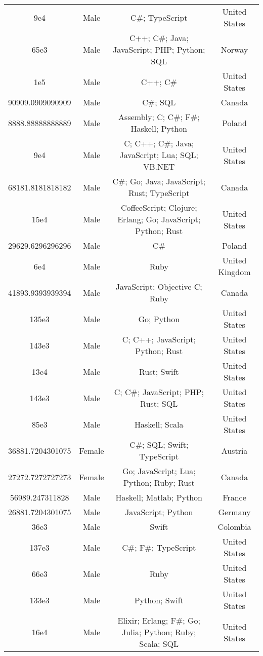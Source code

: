 \begin{center}
\begin{tabular}{ |c|c|c|c| }
9e4  &  Male  &  C\#; TypeScript  &  United States  \\ 
65e3  &  Male  &  C++; C\#; Java; JavaScript; PHP; Python; SQL  &  Norway  \\ 
1e5  &  Male  &  C++; C\#  &  United States  \\ 
90909.0909090909  &  Male  &  C\#; SQL  &  Canada  \\ 
8888.88888888889  &  Male  &  Assembly; C; C\#; F\#; Haskell; Python  &  Poland  \\ 
9e4  &  Male  &  C; C++; C\#; Java; JavaScript; Lua; SQL; VB.NET  &  United States  \\ 
68181.8181818182  &  Male  &  C\#; Go; Java; JavaScript; Rust; TypeScript  &  Canada  \\ 
15e4  &  Male  &  CoffeeScript; Clojure; Erlang; Go; JavaScript; Python; Rust  &  United States  \\ 
29629.6296296296  &  Male  &  C\#  &  Poland  \\ 
6e4  &  Male  &  Ruby  &  United Kingdom  \\ 
41893.9393939394  &  Male  &  JavaScript; Objective-C; Ruby  &  Canada  \\ 
135e3  &  Male  &  Go; Python  &  United States  \\ 
143e3  &  Male  &  C; C++; JavaScript; Python; Rust  &  United States  \\ 
13e4  &  Male  &  Rust; Swift  &  United States  \\ 
143e3  &  Male  &  C; C\#; JavaScript; PHP; Rust; SQL  &  United States  \\ 
85e3  &  Male  &  Haskell; Scala  &  United States  \\ 
36881.7204301075  &  Female  &  C\#; SQL; Swift; TypeScript  &  Austria  \\ 
27272.7272727273  &  Female  &  Go; JavaScript; Lua; Python; Ruby; Rust  &  Canada  \\ 
56989.247311828  &  Male  &  Haskell; Matlab; Python  &  France  \\ 
26881.7204301075  &  Male  &  JavaScript; Python  &  Germany  \\ 
36e3  &  Male  &  Swift  &  Colombia  \\ 
137e3  &  Male  &  C\#; F\#; TypeScript  &  United States  \\ 
66e3  &  Male  &  Ruby  &  United States  \\ 
133e3  &  Male  &  Python; Swift  &  United States  \\ 
16e4  &  Male  &  Elixir; Erlang; F\#; Go; Julia; Python; Ruby; Scala; SQL  &  United States  \\ 

\end{tabular}
\end{center}
